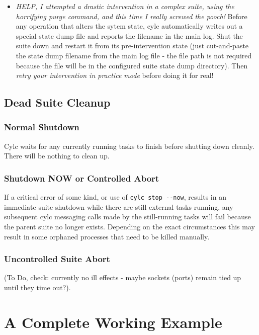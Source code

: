 \documentclass[11pt,a4paper]{article}
\begin{document}
\begin{itemize}
    \item {\em HELP, I attempted a drastic intervention in a complex
        suite, using the horrifying purge command, and this time I
        really screwed the pooch!} Before any operation that alters the
        sytem state, cylc automatically writes out a special state dump
        file and reports the filename in the main log. Shut the suite
        down and restart it from its pre-intervention state (just
        cut-and-paste the state dump filename from the main log file -
        the file path is not required because the file will be in the
        configured suite state dump directory).  Then {\em retry your
        intervention in practice mode} before doing it for real!

\end{itemize}

\subsection{Dead Suite Cleanup}
\label{DeadSuiteCleanup}

\subsubsection{Normal Shutdown}

Cylc waits for any currently running tasks to finish before shutting
down cleanly. There will be nothing to clean up. 

\subsubsection{Shutdown NOW or Controlled Abort}

If a critical error of some kind, or use of \lstinline=cylc stop --now=,
results in an immediate suite shutdown while there are still external
tasks running, any subsequent cylc messaging calls made by the
still-running tasks will fail because the parent suite no longer
exists. Depending on the exact circumstances this may result in some 
orphaned processes that need to be killed manually.

\subsubsection{Uncontrolled Suite Abort}

(To Do, check: currently no ill effects - maybe sockets (ports) remain
tied up until they time out?).

\section{A Complete Working Example}
\label{ACompleteWorkingExample}
\end{document}
